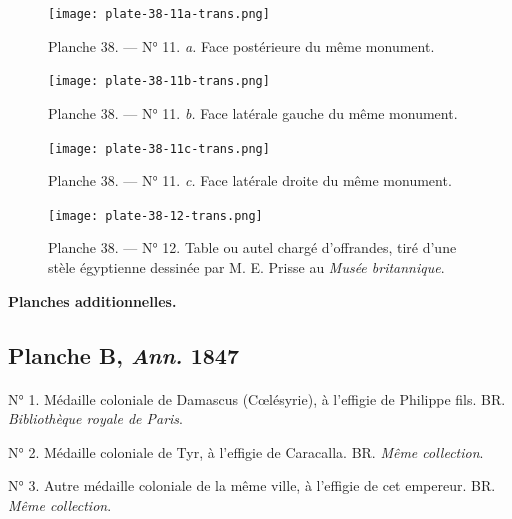 \documentclass[a4paper, 11pt, oneside, polutonikogreek, french]{article}
\begin{document}
\vspace*{\fill}
\clearpage
\vspace*{\fill}
\begin{figure}[H]
\centering
\texttt{[image: plate-38-11a-trans.png]}
\caption{\scriptsize Planche 38. --- N° 11. \emph{a.} Face postérieure du même monument.}
\end{figure}
\vspace*{\fill}
\clearpage
\vspace*{\fill}
\begin{figure}[H]
\centering
\texttt{[image: plate-38-11b-trans.png]}
\caption{\scriptsize Planche 38. --- N° 11. \emph{b.} Face latérale gauche du même monument.}
\end{figure}
\vspace*{\fill}
\clearpage
\vspace*{\fill}
\begin{figure}[H]
\centering
\texttt{[image: plate-38-11c-trans.png]}
\caption{\scriptsize Planche 38. --- N° 11. \emph{c.} Face latérale droite du même monument.}
\end{figure}
\vspace*{\fill}
\clearpage
\vspace*{\fill}
\begin{figure}[H]
\centering
\texttt{[image: plate-38-12-trans.png]}
\caption{\scriptsize Planche 38. --- N° 12. Table ou autel chargé d'offrandes, tiré d'une stèle égyptienne dessinée par M. E. Prisse au \emph{Musée britannique}.}
\end{figure}
\vspace*{\fill}
\clearpage
\pagestyle{plain}
\vspace*{\fill}
\begin{center}
\textbf{Planches additionnelles.}
\end{center}
\subsection{Planche B, \emph{Ann.} 1847}
\paragraph{}
N° 1. Médaille coloniale de Damascus (Cœlésyrie), à l'effigie de Philippe fils. BR. \emph{Bibliothèque royale de Paris}.

N° 2. Médaille coloniale de Tyr, à l'effigie de Caracalla. BR. \emph{Même collection}.

N° 3. Autre médaille coloniale de la même ville, à l'effigie de cet empereur. BR. \emph{Même collection}.
\end{document}
